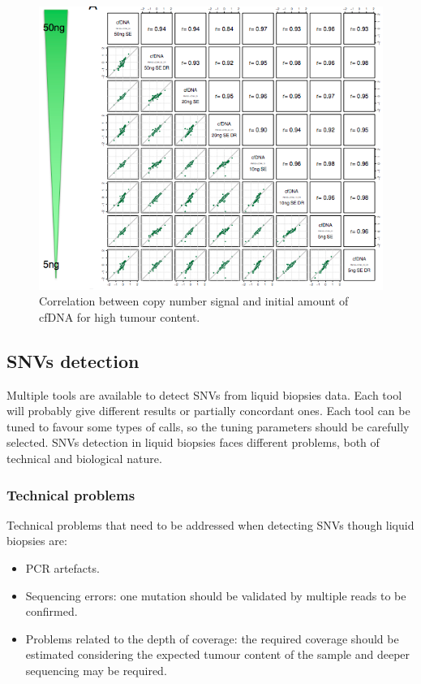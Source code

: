     \begin{figure}[H]
        \centering
        \includegraphics[width=0.7\linewidth]{quantity2.png}
        \caption{Correlation between copy number signal and initial amount of cfDNA for high tumour content.}
        \label{fig:quan2}
    \end{figure}

    \subsection{SNVs detection}
    Multiple tools are available to detect SNVs from liquid biopsies data.
    Each tool will probably give different results or partially concordant ones.
    Each tool can be tuned to favour some types of calls, so the tuning parameters should be carefully selected.
    SNVs detection in liquid biopsies faces different problems, both of technical and biological nature.

        \subsubsection{Technical problems}
        Technical problems that need to be addressed when detecting SNVs though liquid biopsies are:

        \begin{multicols}{2}
            \begin{itemize}
                \item PCR artefacts.
                \item Sequencing errors: one mutation should be validated by multiple reads to be confirmed.
                \item Problems related to the depth of coverage: the required coverage should be estimated considering the expected tumour content of the sample and deeper sequencing may be required.
            \end{itemize}
        \end{multicols}

